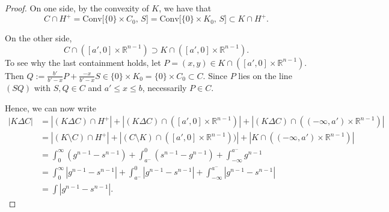 \documentclass[12pt,reqno]{amsart}
\newcommand{\R}{\mathbb{R}}
\theoremstyle{plain}
\theoremstyle{definition}
\theoremstyle{remark}
\numberwithin{equation}{section}
\begin{document}
\begin{proof}
On one side, by the convexity of $K$, we have that
$$C\cap H^+=\text{Conv}\big[\{0\}\times C_0,\,S\big]=\text{Conv}\big[\{0\}\times K_0,\,S\big]\subset K\cap H^+.$$

On the other side,
$$C\cap ([a',0]\times \R^{n-1})\supset K\cap ([a',0]\times \R^{n-1}).$$
To see why the last containment holds, let $P=(x,y)\in K\cap ([a',0]\times \R^{n-1})$. Then $Q:=\frac{b'}{b'-x}P+\frac{-x}{b'-x}S\in \{0\}\times K_0=\{0\}\times C_0 \subset C$. Since $P$ lies on the line $(SQ)$ with $S,Q\in C$ and $a'\leq x\leq b$, necessarily $P\in C$.

Hence, we can now write
\begin{align*}|K\Delta C|&=|(K\Delta C)\cap H^+|+|(K\Delta C)\cap ([a',0]\times \R^{n-1})|+|(K\Delta C)\cap ((-\infty,a')\times \R^{n-1})|\\
&=|(K\setminus C)\cap H^+|+|(C\setminus K)\cap ([a',0]\times \R^{n-1}))|+|K\cap ((-\infty,a')\times \R^{n-1})|\\
&=\int_0^\infty (g^{n-1}-s^{n-1})+\int_{a^-}^0(s^{n-1}-g^{n-1})+\int_{-\infty}^{a^-}g^{n-1}\\
&=\int_{0}^{\infty}|g^{n-1}-s^{n-1}|+\int_{a^-}^0|g^{n-1}-s^{n-1}|+\int_{-\infty}^{a^-} |g^{n-1}-s^{n-1}|\\&=\int |g^{n-1}-s^{n-1}|.
\end{align*}
\end{proof}
\end{document}
